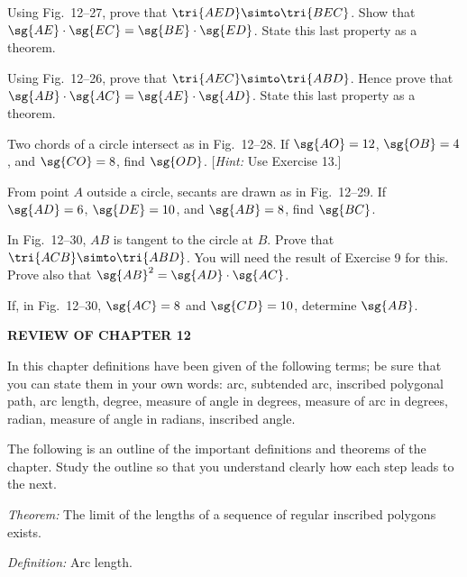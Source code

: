 \documentclass[11pt]{book}
\theoremstyle{bkplain}
\theoremstyle{XIplainnote}
\theoremstyle{bkplain}
\theoremstyle{bkplain}
\begin{document}
\begin{exercisecols}
\begin{exlist}
\item[13.] Using Fig.~12--27, prove that $\tri{AED} \simto \tri{BEC}$. Show that
      $\sg{AE} \cdot \sg{EC} = \sg{BE} \cdot \sg{ED}$. State this last property
      as a theorem.
\item[\stex 14.] Using Fig.~12--26, prove that $\tri{AEC} \simto \tri{ABD}$.
      Hence prove that $\sg{AB} \cdot \sg{AC} = \sg{AE} \cdot \sg{AD}$. State
      this last property as a theorem.
\item[15.] Two chords of a circle intersect as in Fig.~12--28. If
      $\sg{AO} = 12$, $\sg{OB} = 4$, and $\sg{CO} = 8$, find $\sg{OD}$.
      [\emph{Hint:} Use Exercise 13.]
\exfig{\FIGXIITWENTYEIGHT}
\item[\stex 16.] From point $A$ outside a circle, secants are drawn as in
      Fig.~12--29. If $\sg{AD} = 6$, $\sg{DE} = 10$, and $\sg{AB} = 8$, find
      $\sg{BC}$.
\exfig{\FIGXIITWENTYNINE}
\item[\stex 17.] In Fig.~12--30, $AB$ is tangent to the circle at $B$. Prove
      that $\tri{ACB} \simto \tri{ABD}$. You will need the result of Exercise 9
      for this. Prove also that $\sg{AB}^2 = \sg{AD} \cdot \sg{AC}$.
\exfig{\FIGXIITHIRTY}
\item[18.] If, in Fig.~12--30, $\sg{AC} = 8$ and $\sg{CD} = 10$, determine
      $\sg{AB}$.
\end{exlist}

\par\bigskip
\begin{center}\bfseries\large REVIEW OF CHAPTER 12\end{center}
\nopagebreak

In this chapter definitions have been given of the following terms; be sure that
you can state them in your own words: arc, subtended arc, inscribed polygonal
path, arc length, degree, measure of angle in degrees, measure of arc in
degrees, radian, measure of angle in radians, inscribed angle.

The following is an outline of the important definitions and theorems of the
chapter. Study the outline so that you understand clearly how each step leads to
the next.

\par\smallskip\noindent\emph{Theorem:} The limit of the lengths of a sequence of
regular inscribed polygons exists.

\noindent\emph{Definition:} Arc length.


\end{exercisecols}
\end{document}
